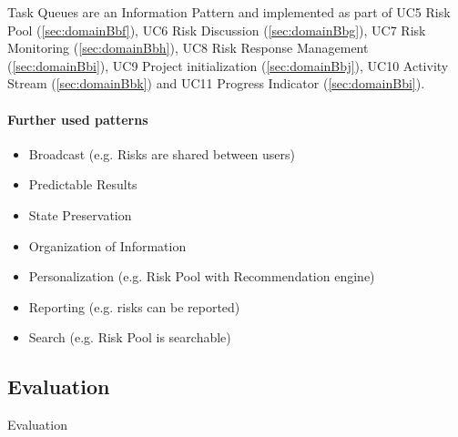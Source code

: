Task Queues are an Information Pattern and implemented as part of \ac{UC}5 Risk Pool (\ref{sec:domainBbf}), \ac{UC}6 Risk Discussion (\ref{sec:domainBbg}), \ac{UC}7 Risk Monitoring (\ref{sec:domainBbh}), \ac{UC}8 Risk Response Management (\ref{sec:domainBbi}), \ac{UC}9 Project initialization (\ref{sec:domainBbj}), \ac{UC}10 Activity Stream (\ref{sec:domainBbk}) and \ac{UC}11 Progress Indicator (\ref{sec:domainBbi}).

\paragraph*{Further used patterns}

\begin{itemize}
	\item Broadcast (e.g. Risks are shared between users)
	\item Predictable Results
	\item State Preservation
	\item Organization of Information
	\item Personalization (e.g. Risk Pool with Recommendation engine)
	\item Reporting (e.g. risks can be reported)
	\item Search (e.g. Risk Pool is searchable)
\end{itemize}


\subsection{Evaluation}
\label{sec:domainCd}
Evaluation
